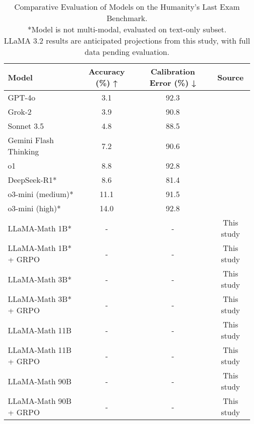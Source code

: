 \begin{table}[H]
  \centering
  \begin{tabular}{lccc}
    \toprule
    Model                   & Accuracy (\%) ↑ & Calibration Error (\%) ↓ & Source \\
    \midrule
    GPT-4o                   & 3.1             & 92.3                      & \cite{phan2025humanitysexam} \\
    Grok-2                   & 3.9             & 90.8                      & \cite{phan2025humanitysexam} \\
    Sonnet 3.5               & 4.8             & 88.5                      & \cite{phan2025humanitysexam} \\
    Gemini Flash Thinking    & 7.2             & 90.6                      & \cite{phan2025humanitysexam} \\
    o1                       & 8.8             & 92.8                      & \cite{phan2025humanitysexam} \\
    DeepSeek-R1*             & 8.6             & 81.4                      & \cite{phan2025humanitysexam} \\
    o3-mini (medium)*        & 11.1            & 91.5                      & \cite{phan2025humanitysexam} \\
    o3-mini (high)*          & 14.0            & 92.8                      & \cite{phan2025humanitysexam} \\
    LLaMA-Math 1B*           & -               & -                         & This study \\
    LLaMA-Math 1B* + GRPO    & -               & -                         & This study \\
    LLaMA-Math 3B*           & -               & -                         & This study \\
    LLaMA-Math 3B* + GRPO    & -               & -                         & This study \\
    LLaMA-Math 11B           & -               & -                         & This study \\
    LLaMA-Math 11B + GRPO    & -               & -                         & This study \\
    LLaMA-Math 90B           & -               & -                         & This study \\
    LLaMA-Math 90B + GRPO    & -               & -                         & This study \\
    \bottomrule
  \end{tabular}
  \vspace{0.2cm}
  \caption{Comparative Evaluation of Models on the Humanity's Last Exam Benchmark.\\
   *Model is not multi-modal, evaluated on text-only subset. \\
   LLaMA 3.2 results are anticipated projections from this study, with full data pending evaluation.}
  \label{tab:results}
\end{table}